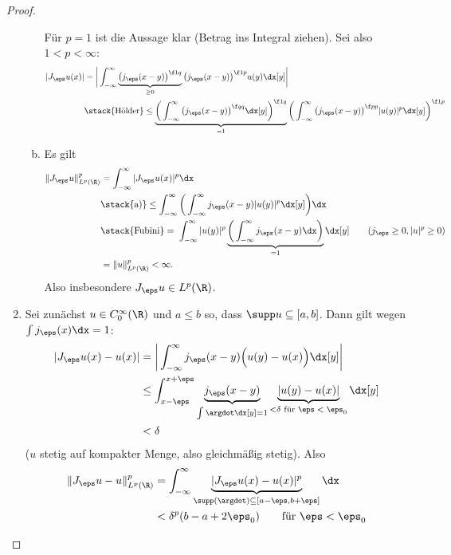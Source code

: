 \begin{st}
\begin{proof}
\begin{enumerate}[1)]
\begin{enumerate}[a)]
						Für $p=1$ ist die Aussage klar (Betrag ins Integral ziehen).
						Sei also $1 < p < \infty$:
						\begin{align*}
							|J_\eps u(x)|
							&= \bigg| \int_{-\infty}^\infty \underbrace{\big(j_\eps(x-y)\big)^{\f 1q}}_{\ge 0} \big(j_\eps(x-y)\big)^{\f 1p} u(y) \dx[y] \bigg| \\
							&\stack{\text{Hölder}}\le \underbrace{\bigg( \int_{-\infty}^\infty \big(j_\eps(x-y)\big)^{\f qq} \dx[y] \bigg)^{\f 1q}}_{=1} \bigg( \int_{-\infty}^\infty \big(j_\eps(x-y)\big)^{\f pp} |u(y)|^p \dx[y] \bigg)^{\f 1p}
						\end{align*}
					\item
						Es gilt
						\begin{align*}
							\| J_\eps u \|_{L^p(\R)}^p
							&= \int_{-\infty}^\infty |J_\eps u(x)|^p \dx \\
							&\stack{\text{a)}}\le \int_{-\infty}^\infty \bigg( \int_{-\infty}^\infty j_\eps(x-y) |u(y)|^p \dx[y] \bigg) \dx \\
							&\stack{\text{Fubini}}=\; \int_{-\infty}^\infty |u(y)|^p \underbrace{\bigg( \int_{-\infty}^\infty j_\eps(x-y) \dx \bigg)}_{=1} \dx[y] \qquad \text{($j_\eps \ge 0, |u|^p \ge 0$)} \\
							&= \|u\|_{L^p(\R)}^p < \infty.
						\end{align*}
						Also insbesondere $J_\eps u \in L^p(\R)$.
				\end{enumerate}
			\item
				Sei zunächst $u \in C_0^\infty(\R)$ und $a\le b$ so, dass $\supp u \subset [a,b]$.
				Dann gilt wegen $\int j_\eps(x) \dx = 1$:
				\begin{align*}
					|J_\eps u(x) - u(x)|
					&= \bigg| \int_{-\infty}^\infty j_\eps(x-y) \Big(u(y) - u(x)\Big) \dx[y] \bigg| \\
					&\le \int_{x-\eps}^{x+\eps} \underbrace{j_\eps(x-y)}_{\int \argdot \dx[y] = 1} \underbrace{|u(y)-u(x)|}_{< \delta \text{ für $\eps < \eps_0$}} \dx[y] \\
					&< \delta
				\end{align*}
				($u$ stetig auf kompakter Menge, also gleichmäßig stetig).
				Also
				\begin{align*}
					\|J_\eps u - u\|_{L^p(\R)}^p
					&= \int_{-\infty}^\infty \underbrace{|J_\eps u(x) - u(x)|^p}_{\supp(\argdot) \subset [a-\eps, b+ \eps]} \dx \\
					&< \delta^p (b-a + 2\eps_0) \qquad \text{für $\eps < \eps_0$} \\

\end{align*}
\end{enumerate}
\end{proof}
\end{st}
